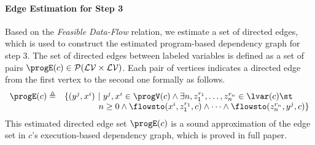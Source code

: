 \paragraph*{Edge Estimation for Step 3}
Based on the \emph{Feasible Data-Flow} relation,
we  estimate a set of directed edges, which is 
used to construct the estimated program-based dependency graph for step 3.
The set of directed edges between labeled variables is defined
as a set of pairs 
$\progE(c) \in \mathcal{P}( \mathcal{LV} \times \mathcal{LV})$.
Each pair of vertices indicates a directed edge from the first vertex to the second one
formally as follows.
{
  \[
    \begin{array}{ll}
    \progE(c) \triangleq &
    \{ 
    (y^j, x^i) 
    ~ \vert ~
      y^j, x^i \in \progV(c)
    \land
      \exists n,
      z_1^{r_1}, \ldots, z_n^{r_n} \in \lvar(c) \st 
    \\ 
    & \qquad \qquad
      n \geq 0 \land
      \flowsto(x^i,  z_1^{r_1}, c) 
      \land \cdots \land \flowsto(z_n^{r_n}, y^j, c) 
    \}
    \end{array}
    \]
}
This estimated directed edge set $\progE(c)$ is a sound approximation of the 
edge set in $c$'s execution-based dependency graph, which is proved in full paper.
